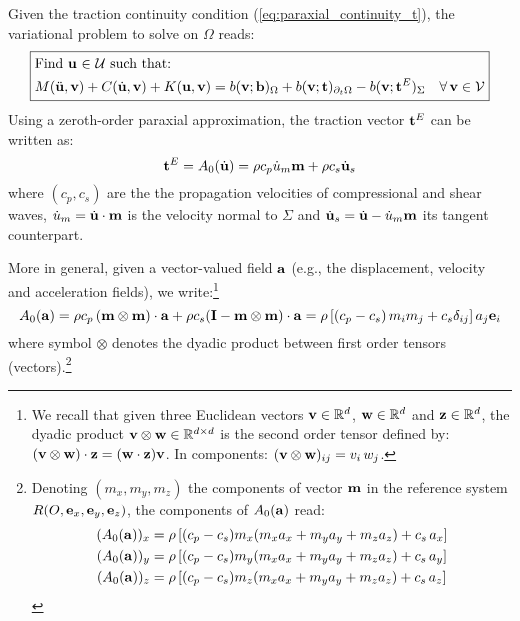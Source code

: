 Given the traction continuity condition (\ref{eq:paraxial_continuity_t}),
the variational problem to solve on $\Omega$ reads:
\begin{equation}
\boxed{\begin{aligned} & \text{Find \ensuremath{{\bf{u}}} \ensuremath{\in} \ensuremath{\mathcal{U}} such that: }\\
 & M(\ddot{{\bf{u}}},{\bf{v}})+C(\dot{{\bf{u}}},{\bf{v}})+K({\bf{u}},{\bf{v}})=b({\bf{v}};{\bf{b}})_{\Omega}+b({\bf{v}};{\bf t})_{\partial_{t}\Omega}-b({\bf{v}};{\bf t}^{E})_{\Sigma}\quad\forall\,{\bf{v}}\in\mathcal{V}
\end{aligned}
}\label{eq:paraxial_varf_1}
\end{equation}
Using a zeroth-order paraxial approximation, the traction vector ${\bf t}^{E}$ can be written as:
\begin{equation}
{\bf t}^{E}=A_{0}(\dot{{\bf{u}}}) = \rho c_p \dot{u}_m {\bf m} + \rho c_s \dot{{\bf{u}}}_s
\label{eq:paraxial_lin_form}
\end{equation}
where $(c_p,c_s)$ are the the propagation velocities of compressional and shear waves, $\dot{u}_m = \dot{{\bf{u}}} \cdot {\bf m}$ is the velocity normal to $\Sigma$ and  $\dot{{\bf{u}}}_s = \dot{{\bf{u}}} - \dot{u}_m {\bf m}$ its tangent counterpart.

More in general, given a vector-valued field ${\bf{a}}$ (e.g., the displacement, velocity and acceleration fields), we write:\footnote{We recall that given three Euclidean vectors ${\bf{v}} \in \mathbb{R}^d$, ${\bf w}\in \mathbb{R}^d$ and ${\bf z}\in \mathbb{R}^d$, the dyadic product ${\bf{v}} \otimes {\bf w} \in \mathbb{R}^{d\times d}$ is the second order tensor defined by: $({\bf{v}} \otimes {\bf w})\cdot {\bf z} = ({\bf w}\cdot {\bf z}) {\bf{v}} $. In components: $({\bf{v}} \otimes {\bf w})_{ij}=v_i\,w_j$.}
\begin{equation}
    A_{0}({\bf{a}}) = \rho c_p \, ({\bf m} \otimes {\bf m}) \cdot {\bf{a}} + \rho c_s ({{{\bf{I}}}} - {\bf m} \otimes {\bf m}) \cdot {\bf{a}} = \rho \left[ (c_p - c_s)\, m_i m_j + c_s \delta_{ij} \right] a_j {\bf{e}}_i
\end{equation}
where symbol $\otimes$ denotes the dyadic product between first order tensors (vectors).\footnote{Denoting $(m_x,m_y,m_z)$ the components of vector ${\bf m}$ in the reference system $R(O,{\bf{e}}_x,{\bf{e}}_y,{\bf{e}}_z)$, the components of $A_{0}({\bf{a}})$ read:
\begin{align}
    (A_{0}({\bf{a}}))_x & = \rho \left[(c_p-c_s) m_x (m_x a_x + m_y a_y + m_z a_z) + c_s\,a_x \right] \\
    (A_{0}({\bf{a}}))_y & =  \rho \left[(c_p-c_s) m_y (m_x a_x + m_y a_y + m_z a_z) + c_s\,a_y \right] \\
    (A_{0}({\bf{a}}))_z & =  \rho \left[(c_p-c_s) m_z (m_x a_x + m_y a_y + m_z a_z) + c_s\,a_z \right]
\end{align}}

